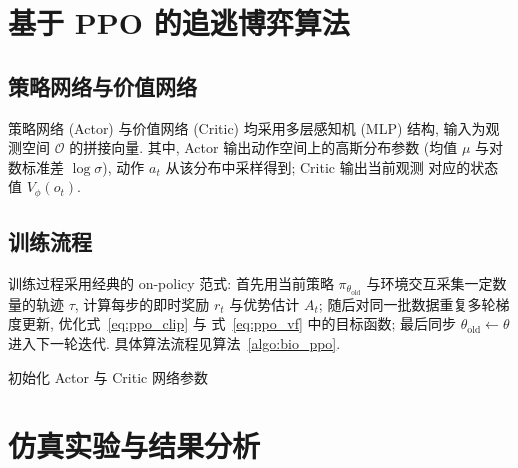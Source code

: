 \section{基于 PPO 的追逃博弈算法}
\label{sec:pe_algorithm}

\subsection{策略网络与价值网络}
\label{subsec:pe_network}
策略网络 (Actor) 与价值网络 (Critic) 均采用多层感知机 (MLP) 结构, 输入为观测空间
$\mathcal{O}$ 的拼接向量. 其中, Actor 输出动作空间上的高斯分布参数 (均值 $\mu$
与对数标准差 $\log\sigma$), 动作 $a_t$ 从该分布中采样得到; Critic 输出当前观测
对应的状态值 $V_\phi(o_t)$.

\subsection{训练流程}
\label{subsec:pe_train}
训练过程采用经典的 on-policy 范式: 首先用当前策略 $\pi_{\theta_{\mathrm{old}}}$
与环境交互采集一定数量的轨迹 $\tau$, 计算每步的即时奖励 $r_t$ 与优势估计 $A_t$;
随后对同一批数据重复多轮梯度更新, 优化式~\eqref{eq:ppo_clip} 与
式~\eqref{eq:ppo_vf} 中的目标函数; 最后同步 $\theta_{\mathrm{old}}\leftarrow\theta$
进入下一轮迭代. 具体算法流程见算法~\ref{algo:bio_ppo}.

\begin{algorithm}[!htbp]
  \caption{基于生物启发 PPO 的无人艇追逃博弈算法}
  \label{algo:bio_ppo}
  \DontPrintSemicolon
  初始化 Actor 与 Critic 网络参数\;
\end{algorithm}

\section{仿真实验与结果分析}
\label{sec:pe_exp}

